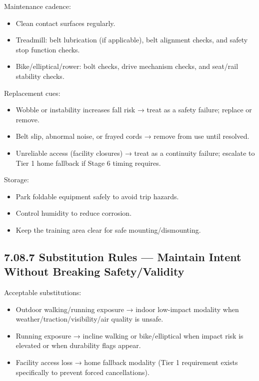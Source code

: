 \documentclass[10pt]{article}
\begin{document}
Maintenance cadence:

\begin{itemize}
\item Clean contact surfaces regularly.
\item Treadmill: belt lubrication (if applicable), belt alignment checks, and safety stop function checks.
\item Bike/elliptical/rower: bolt checks, drive mechanism checks, and seat/rail stability checks.
\end{itemize}

Replacement cues:

\begin{itemize}
\item Wobble or instability increases fall risk → treat as a safety failure; replace or remove.
\item Belt slip, abnormal noise, or frayed cords → remove from use until resolved.
\item Unreliable access (facility closures) → treat as a continuity failure; escalate to Tier 1 home fallback if Stage 6 timing requires.
\end{itemize}

Storage:

\begin{itemize}
\item Park foldable equipment safely to avoid trip hazards.
\item Control humidity to reduce corrosion.
\item Keep the training area clear for safe mounting/dismounting.
\end{itemize}

\subsection*{7.08.7 Substitution Rules — Maintain Intent Without Breaking Safety/Validity}
{}

Acceptable substitutions:

\begin{itemize}
\item Outdoor walking/running exposure → indoor low-impact modality when weather/traction/visibility/air quality is unsafe.
\item Running exposure → incline walking or bike/elliptical when impact risk is elevated or when durability flags appear.
\item Facility access loss → home fallback modality (Tier 1 requirement exists specifically to prevent forced cancellations).
\end{itemize}
\end{document}
